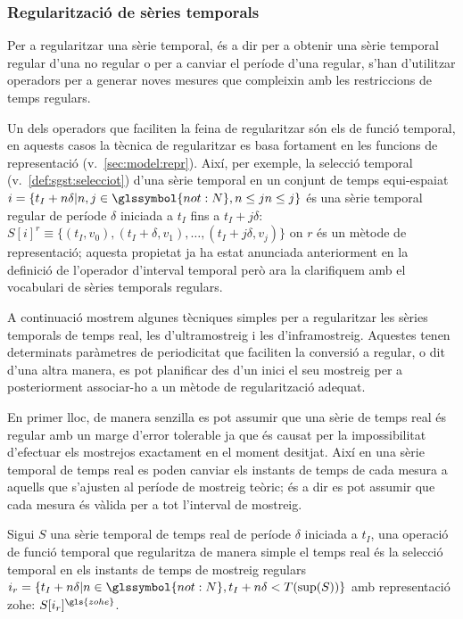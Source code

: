\subsubsection{Regularització de sèries temporals}



Per a regularitzar una sèrie temporal, és a dir per a obtenir una
sèrie temporal regular d'una no regular o per a canviar el període
d'una regular, s'han d'utilitzar operadors per a generar noves mesures
que compleixin amb les restriccions de temps regulars.


Un dels operadors que faciliten la feina de regularitzar són els de
funció temporal, en aquests casos la tècnica de regularitzar es basa
fortament en les funcions de representació
(v.~\autoref{sec:model:repr}).  Així, per exemple, la selecció
temporal (v.~\autoref{def:sgst:selecciot}) d'una sèrie temporal en un
conjunt de temps equi-espaiat $i = \{t_I+n\delta |
n,j\in\glssymbol{not:N}, n\leq j n\leq j\}$ és una sèrie temporal
regular de període $\delta$ iniciada a $t_I$ fins a $t_I+j\delta$:
$S[i]^r \equiv \{ (t_I, v_0), (t_I+\delta,v_1), \dotsc ,
(t_I+j\delta,v_j)\}$ on $r$ és un mètode de representació; aquesta
propietat ja ha estat anunciada anteriorment en la definició de
l'operador d'interval temporal però ara la clarifiquem amb el
vocabulari de sèries temporals regulars. 


A continuació mostrem algunes tècniques simples per a regularitzar les
sèries temporals de temps real, les d'ultramostreig i les
d'inframostreig. Aquestes tenen determinats paràmetres de periodicitat
que faciliten la conversió a regular, o dit d'una altra manera, es pot
planificar des d'un inici el seu mostreig per a posteriorment
associar-ho a un mètode de regularització adequat.


En primer lloc, de manera senzilla es pot assumir que una sèrie de
temps real és regular amb un marge d'error tolerable ja que és causat
per la impossibilitat d'efectuar els mostrejos exactament en el moment
desitjat. Així en una sèrie temporal de temps real es poden canviar
els instants de temps de cada mesura a aquells que s'ajusten al
període de mostreig teòric; és a dir es pot assumir que cada mesura és
vàlida per a tot l'interval de mostreig. 

Sigui $S$ una sèrie temporal de temps real de període $\delta$
iniciada a $t_I$, una operació de funció temporal que regularitza de
manera simple el temps real és la selecció temporal en els instants de
temps de mostreig regulars $i_r=\{t_I+n\delta | n\in\glssymbol{not:N},
t_I+n\delta < T(\sup(S))\}$ amb representació \gls{zohe}:
$S[i_r]^{\gls{zohe}}$.

